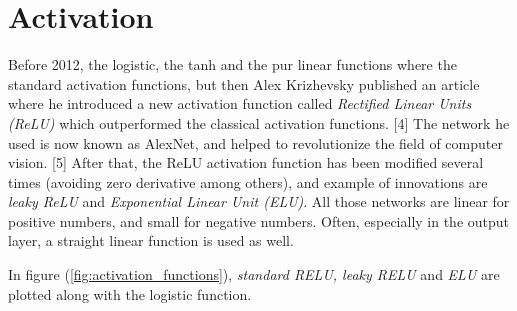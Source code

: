 \section{Activation}
Before 2012, the logistic, the tanh and the pur linear functions where the standard activation functions, but then Alex Krizhevsky published an article where he introduced a new activation function called \textit{Rectified Linear Units (ReLU)} which outperformed the classical activation functions. [4] The network he used is now known as AlexNet, and helped to revolutionize the field of computer vision. [5] After that, the ReLU activation function has been modified several times (avoiding zero derivative among others), and example of innovations are \textit{leaky ReLU} and \textit{Exponential Linear Unit (ELU)}. All those networks are linear for positive numbers, and small for negative numbers. Often, especially in the output layer, a straight linear function is used as well.

In figure (\ref{fig:activation_functions}), \textit{standard RELU, leaky RELU} and \textit{ELU} are plotted along with the logistic function.

